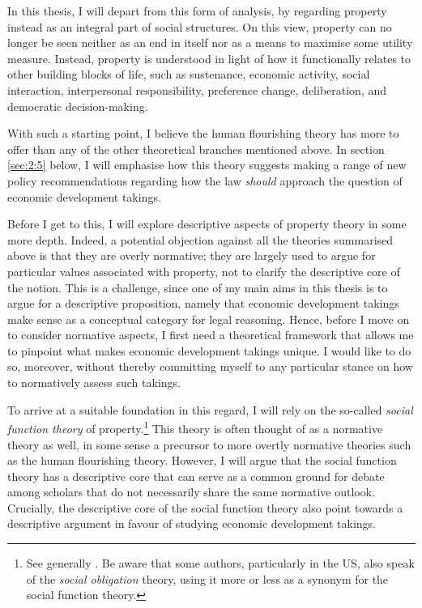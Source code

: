 In this thesis, I will depart from this form of analysis, by regarding property instead as an integral part of social structures. On this view, property can no longer be seen neither as an end in itself nor as a means to maximise some utility measure. Instead, property is understood in light of how it functionally relates to other building blocks of life, such as sustenance, economic activity, social interaction, interpersonal responsibility, preference change, deliberation, and democratic decision-making.

With such a starting point, I believe the human flourishing theory has more to offer than any of the other theoretical branches mentioned above. In section \ref{sec:2:5} below, I will emphasise how this theory suggests making a range of new policy recommendations regarding how the law {\it should} approach the question of economic development takings.

Before I get to this, I will explore descriptive aspects of property theory in some more depth. Indeed, a potential objection against all the theories summarised above is that they are overly normative; they are largely used to argue for particular values associated with property, not to clarify the descriptive core of the notion. This is a challenge, since one of my main aims in this thesis is to argue for a descriptive proposition, namely that economic development takings make sense as a conceptual category for legal reasoning. Hence, before I move on to consider normative aspects, I first need a theoretical framework that allows me to pinpoint what makes economic development takings unique. I would like to do so, moreover, without thereby committing myself to any particular stance on how to normatively assess such takings.

To arrive at a suitable foundation in this regard, I will rely on the so-called {\it social function theory} of property.\footnote{See generally \cite{foster11,mirow10,alexander09a}. Be aware that some authors, particularly in the US, also speak of the {\it social obligation} theory, using it more or less as a synonym for the social function theory.} This theory is often thought of as a normative theory as well, in some sense a precursor to more overtly normative theories such as the human flourishing theory. However, I will argue that the social function theory has a descriptive core that can serve as a common ground for debate among scholars that do not necessarily share the same normative outlook. Crucially, the descriptive core of the social function theory also point towards a descriptive argument in favour of studying economic development takings.

